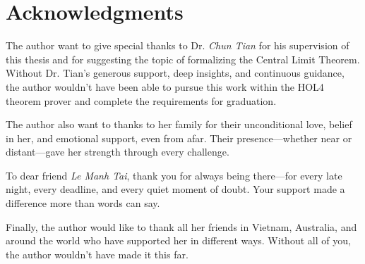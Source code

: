 \chapter*{Acknowledgments}
\label{ack}

The author want to give special thanks to Dr. \emph{Chun Tian} for his supervision of this thesis and for suggesting the topic of formalizing the Central Limit Theorem. Without Dr. Tian’s generous support, deep insights, and continuous guidance, the author wouldn't have been able to pursue this work within the HOL4 theorem prover and complete the requirements for graduation.

The author also want to thanks to her family for their unconditional love, belief in her, and emotional support, even from afar. Their presence—whether near or distant—gave her strength through every challenge.

To dear friend \emph{Le Manh Tai}, thank you for always being there—for every late night, every deadline, and every quiet moment of doubt. Your support made a difference more than words can say.

Finally, the author would like to thank all her friends in Vietnam, Australia, and around the world who have supported her in different ways. Without all of you, the author wouldn’t have made it this far.
